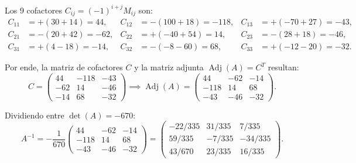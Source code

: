 \documentclass[spanish,letterpaper,oneside]{article}
\begin{document}
Los 9 cofactores $C_{ij} = (-1)^{i+j} M_{ij}$ son:
\begin{equation*}
\begin{aligned}
C_{11} &= +(30+14) = 44, & C_{12} &= -(100+18) = -118, & C_{13} &= +(-70+27) = -43, \\
C_{21} &= -(20+42) = -62, & C_{22} &= +(-40+54) = 14, & C_{23} &= -(28+18) = -46, \\
C_{31} &= +(4-18) = -14, & C_{32} &= -(-8-60) = 68, & C_{33} &= +(-12-20) = -32.
\end{aligned}
\end{equation*}

Por ende, la matriz de cofactores $C$ y la matriz adjunta $\operatorname{Adj}(A) = C^T$ resultan:
\begin{equation}
C = \begin{pmatrix} 44 & -118 & -43 \\ -62 & 14 & -46 \\ -14 & 68 & -32 \end{pmatrix} \implies
\operatorname{Adj}(A) = \begin{pmatrix} 44 & -62 & -14 \\ -118 & 14 & 68 \\ -43 & -46 & -32 \end{pmatrix}.
\end{equation}

Dividiendo entre $\det(A) = -670$:
\begin{equation}
A^{-1} = -\frac{1}{670} \begin{pmatrix} 44 & -62 & -14 \\ -118 & 14 & 68 \\ -43 & -46 & -32 \end{pmatrix} =
\begin{pmatrix}
-22/335 & 31/335 & 7/335 \\
59/335 & -7/335 & -34/335 \\
43/670 & 23/335 & 16/335
\end{pmatrix}.
\end{equation}
\end{document}
